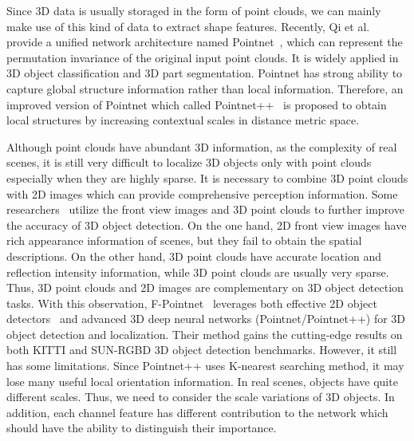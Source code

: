 \documentclass[letterpaper]{article} %
\begin{document}
Since 3D data is usually storaged in the form of point clouds, we can mainly make use of this kind of data to extract shape features. Recently, Qi et al. provide a unified network architecture named Pointnet~\cite{qi2017pointnet}, which can represent the permutation invariance of the original input point clouds. It is widely applied in 3D object classification and 3D part segmentation. Pointnet has strong ability to capture global structure information rather than local information. Therefore, an improved version of Pointnet which called Pointnet++~\cite{qi2017pointnet++} is proposed to obtain local structures by increasing contextual scales in distance metric space.

Although point clouds have abundant 3D information, as the complexity of real scenes, it is still very difficult to localize 3D objects only with point clouds especially when they are highly sparse. It is necessary to combine 3D point clouds with 2D images which can provide comprehensive perception information. Some researchers~\cite{wang2017fusing,ku2018joint} utilize the front view images and 3D point clouds to further improve the accuracy of 3D object detection. On the one hand, 2D front view images have rich appearance information of scenes, but they fail to obtain the spatial descriptions. On the other hand, 3D point clouds have accurate location and reflection intensity information, while 3D point clouds are usually very sparse. Thus, 3D point clouds and 2D images are complementary on 3D object detection tasks. With this observation, F-Pointnet~\cite{qi2017frustum} leverages both effective 2D object detectors~\cite{fu2017dssd,lin2017feature} and advanced 3D deep neural networks (Pointnet/Pointnet++) for 3D object detection and localization. Their method gains the cutting-edge results on both KITTI and SUN-RGBD 3D object detection benchmarks. However, it still has some limitations. Since Pointnet++ uses K-nearest searching method, it may lose many useful local orientation information. In real scenes, objects have quite different scales. Thus, we need to consider the scale variations of 3D objects. In addition, each channel feature has different contribution to the network which should have the ability to distinguish their importance.
\end{document}
